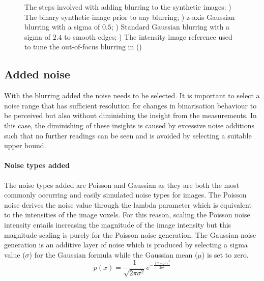 \begin{figure}[hb!]
	\caption[The steps involved with adding blurring to the synthetic images.]{The steps involved with adding blurring to the synthetic images: ) The binary synthetic image prior to any blurring; ) z-axis Gaussian blurring with a sigma of $0.5$; ) Standard Gaussian blurring with a sigma of $2.4$ to smooth edges; ) The intensity image reference used to tune the out-of-focus blurring in ()}
	\label{fig:blurring_panel}
\end{figure}

\FloatBarrier
\subsection{Added noise}
With the blurring added the noise needs to be selected. It is important to select a noise range that has sufficient resolution for changes in binarisation behaviour to be perceived but also without diminishing the insight from the measurements. In this case, the diminishing of these insights is caused by excessive noise additions such that no further readings can be seen and is avoided by selecting a suitable upper bound. 
\paragraph{Noise types added} The noise types added are Poisson and Gaussian as they are both the most commonly occurring and easily simulated noise types for images. The Poisson noise derives the noise value through the lambda parameter which is equivalent to the intensities of the image voxels. For this reason, scaling the Poisson noise intensity entails increasing the magnitude of the image intensity but this magnitude scaling is purely for the Poisson noise generation. The Gaussian noise generation is an additive layer of noise which is produced by selecting a sigma value ($\sigma$) for the Gaussian formula while the Gaussian mean ($\mu$) is set to zero.
\begin{equation}
	p(x) = \frac{1}{\sqrt{2\pi \sigma^2}}e^{-\frac{(x-\mu)^2}{2\sigma^2}}
\end{equation}
